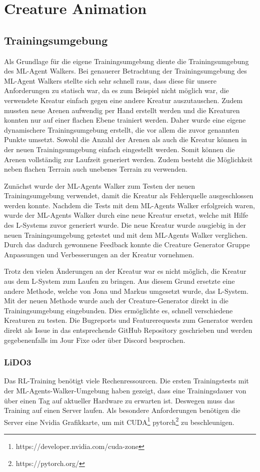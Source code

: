 \section{Creature Animation}

\subsection{Trainingsumgebung}
Als Grundlage für die eigene Trainingsumgebung diente die Trainingsumgebung des ML-Agent Walkers. Bei genauerer Betrachtung der Trainingsumgebung des ML-Agent Walkers stellte sich sehr schnell raus, dass diese für unsere Anforderungen zu statisch war, da es zum Beispiel nicht möglich war, die verwendete Kreatur einfach gegen eine andere Kreatur auszutauschen. Zudem mussten neue Arenen aufwendig per Hand erstellt werden und die Kreaturen konnten nur auf einer flachen Ebene trainiert werden. Daher wurde eine eigene dynamischere Trainingsumgebung erstellt, die vor allem die zuvor genannten Punkte umsetzt. Sowohl die Anzahl der Arenen als auch die Kreatur können in der neuen Trainingsumgebung einfach eingestellt werden. Somit können die Arenen vollständig zur Laufzeit generiert werden. Zudem besteht die Möglichkeit neben flachen Terrain auch unebenes Terrain zu verwenden.

Zunächst wurde der ML-Agents Walker zum Testen der neuen Trainingsumgebung verwendet, damit die Kreatur als Fehlerquelle ausgeschlossen werden konnte. Nachdem die Tests mit dem ML-Agents Walker erfolgreich waren, wurde der ML-Agents Walker durch eine neue Kreatur ersetzt, welche mit Hilfe des L-Systems zuvor generiert wurde. Die neue Kreatur wurde ausgiebig in der neuen Trainingsumgebung getestet und mit dem ML-Agents Walker verglichen. Durch das dadurch gewonnene Feedback konnte die Creature Generator Gruppe Anpassungen und Verbesserungen an der Kreatur vornehmen.

Trotz den vielen Änderungen an der Kreatur war es nicht möglich, die Kreatur aus dem L-System zum Laufen zu bringen. Aus diesem Grund ersetzte eine andere Methode, welche von Jona und Markus umgesetzt wurde, das L-System. Mit der neuen Methode wurde auch der Creature-Generator direkt in die Trainingsumgebung eingebunden. Dies ermöglichte es, schnell verschiedene Kreaturen zu testen. Die Bugreports und Featurerequests zum Generator werden direkt als Issue in das entsprechende GitHub Repository geschrieben und werden gegebenenfalls im Jour Fixe oder über Discord besprochen.

\subsubsection{LiDO3}
Das RL-Training benötigt viele Rechenressourcen. Die ersten Trainingstests mit der ML-Agents-Walker-Umgebung haben gezeigt, dass eine Trainingsdauer von über einen Tag auf aktueller Hardware zu erwarten ist. Deswegen muss das Training auf einen Server laufen. Als besondere Anforderungen benötigen die Server eine Nvidia Grafikkarte, um mit CUDA\footnote{https://developer.nvidia.com/cuda-zone} pytorch\footnote{https://pytorch.org/} zu beschleunigen.

